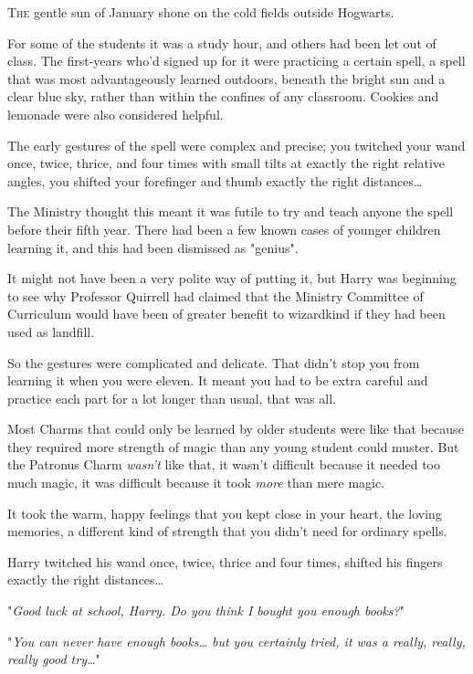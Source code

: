 
\lettrine{T}{he} gentle sun of
January shone on the cold fields outside Hogwarts.

For some of the students it was a study hour, and others had been let out of
class. The first-years who'd signed up for it were practicing a certain spell,
a spell that was most advantageously learned outdoors, beneath the bright sun
and a clear blue sky, rather than within the confines of any classroom. Cookies
and lemonade were also considered helpful.

The early gestures of the spell were complex and precise; you twitched your
wand once, twice, thrice, and four times with small tilts at exactly the right
relative angles, you shifted your forefinger and thumb exactly the right
distances{\ldots}

The Ministry thought this meant it was futile to try and teach anyone the spell
before their fifth year. There had been a few known cases of younger children
learning it, and this had been dismissed as "genius".

It might not have been a very polite way of putting it, but Harry was beginning
to see why Professor Quirrell had claimed that the Ministry Committee of
Curriculum would have been of greater benefit to wizardkind if they had been
used as landfill.

So the gestures were complicated and delicate. That didn't stop you from
learning it when you were eleven. It meant you had to be extra careful and
practice each part for a lot longer than usual, that was all.

Most Charms that could only be learned by older students were like that because
they required more strength of magic than any young student could muster. But
the Patronus Charm \emph{wasn't} like that, it wasn't difficult because it
needed too much magic, it was difficult because it took \emph{more} than mere
magic.

It took the warm, happy feelings that you kept close in your heart, the loving
memories, a different kind of strength that you didn't need for ordinary spells.

Harry twitched his wand once, twice, thrice and four times, shifted his fingers
exactly the right distances{\ldots}

"\emph{Good luck at school, Harry. Do you think I bought you enough books?}"

"\emph{You can never have enough books{\ldots} but you certainly tried, it was
a really, really, really good try{\ldots}}"

